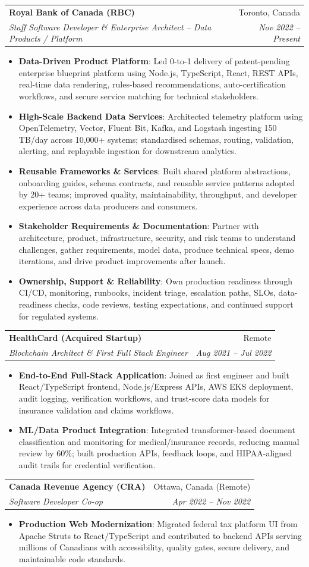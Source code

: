 \documentclass[letterpaper,9.5pt]{article}
\makeatletter
\newcommand{\resumeItem}[2]{\item\small{\textbf{#1}{: #2 \vspace{-2pt}}}}
\newcommand{\resumeSubheading}[4]{\vspace{-2pt}\item\begin{tabular*}{0.97\textwidth}{l@{\extracolsep{\fill}}r}\textbf{#1} & #2 \\\textit{\small#3} & \textit{\small #4} \\\end{tabular*}\vspace{-6pt}}
\newcommand{\resumeItemListStart}{\begin{itemize}}
\newcommand{\resumeItemListEnd}{\end{itemize}\vspace{-6pt}}
\makeatother
\begin{document}
  \resumeSubheading
    {Royal Bank of Canada (RBC)}{Toronto, Canada}
    {Staff Software Developer \& Enterprise Architect -- Data Products / Platform}{Nov 2022 -- Present}
  \resumeItemListStart
    \resumeItem{Data-Driven Product Platform}
      {Led 0-to-1 delivery of patent-pending enterprise blueprint platform using Node.js, TypeScript, React, REST APIs, real-time data rendering, rules-based recommendations, auto-certification workflows, and secure service matching for technical stakeholders.}
    \resumeItem{High-Scale Backend Data Services}
      {Architected telemetry platform using OpenTelemetry, Vector, Fluent Bit, Kafka, and Logstash ingesting 150\,TB/day across 10,000+ systems; standardised schemas, routing, validation, alerting, and replayable ingestion for downstream analytics.}
    \resumeItem{Reusable Frameworks \& Services}
      {Built shared platform abstractions, onboarding guides, schema contracts, and reusable service patterns adopted by 20+ teams; improved quality, maintainability, throughput, and developer experience across data producers and consumers.}
    \resumeItem{Stakeholder Requirements \& Documentation}
      {Partner with architecture, product, infrastructure, security, and risk teams to understand challenges, gather requirements, model data, produce technical specs, demo iterations, and drive product improvements after launch.}
    \resumeItem{Ownership, Support \& Reliability}
      {Own production readiness through CI/CD, monitoring, runbooks, incident triage, escalation paths, SLOs, data-readiness checks, code reviews, testing expectations, and continued support for regulated systems.}
  \resumeItemListEnd

  \resumeSubheading
    {HealthCard (Acquired Startup)}{Remote}
    {Blockchain Architect \& First Full Stack Engineer}{Aug 2021 -- Jul 2022}
  \resumeItemListStart
    \resumeItem{End-to-End Full-Stack Application}
      {Joined as first engineer and built React/TypeScript frontend, Node.js/Express APIs, AWS EKS deployment, audit logging, verification workflows, and trust-score data models for insurance validation and claims workflows.}
    \resumeItem{ML/Data Product Integration}
      {Integrated transformer-based document classification and monitoring for medical/insurance records, reducing manual review by 60\%; built production APIs, feedback loops, and HIPAA-aligned audit trails for credential verification.}
  \resumeItemListEnd

  \resumeSubheading
    {Canada Revenue Agency (CRA)}{Ottawa, Canada (Remote)}
    {Software Developer Co-op}{Apr 2022 -- Nov 2022}
  \resumeItemListStart
    \resumeItem{Production Web Modernization}
      {Migrated federal tax platform UI from Apache Struts to React/TypeScript and contributed to backend APIs serving millions of Canadians with accessibility, quality gates, secure delivery, and maintainable code standards.}
  \resumeItemListEnd
\end{document}
